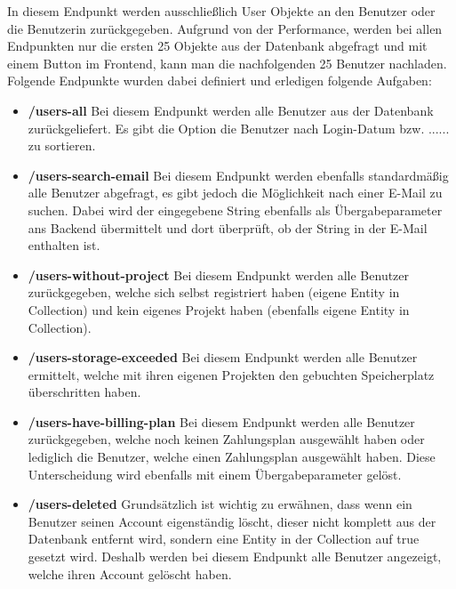 In diesem Endpunkt werden ausschließlich User Objekte an den Benutzer oder die Benutzerin zurückgegeben. Aufgrund von der Performance, werden bei allen Endpunkten nur die ersten 25 Objekte aus der Datenbank abgefragt und mit einem Button im Frontend, kann man die nachfolgenden 25 Benutzer nachladen. Folgende Endpunkte wurden dabei definiert und erledigen folgende Aufgaben:
\begin{itemize}
    \item \textbf{/users-all}
        \newline
        Bei diesem Endpunkt werden alle Benutzer aus der Datenbank zurückgeliefert. Es gibt die Option die Benutzer nach Login-Datum bzw. ...... zu sortieren.
    \item \textbf{/users-search-email}
        \newline
        Bei diesem Endpunkt werden ebenfalls standardmäßig alle Benutzer abgefragt, es gibt jedoch die Möglichkeit nach einer E-Mail zu suchen. Dabei wird der eingegebene String ebenfalls als Übergabeparameter ans Backend übermittelt und dort überprüft, ob der String in der E-Mail enthalten ist.
    \item \textbf{/users-without-project}
        \newline
        Bei diesem Endpunkt werden alle Benutzer zurückgegeben, welche sich selbst registriert haben (eigene Entity in Collection) und kein eigenes Projekt haben (ebenfalls eigene Entity in Collection).
    \item \textbf{/users-storage-exceeded}
        \newline
        Bei diesem Endpunkt werden alle Benutzer ermittelt, welche mit ihren eigenen Projekten den gebuchten Speicherplatz überschritten haben.
    \item \textbf{/users-have-billing-plan}
        \newline
        Bei diesem Endpunkt werden alle Benutzer zurückgegeben, welche noch keinen Zahlungsplan ausgewählt haben oder lediglich die Benutzer, welche einen Zahlungsplan ausgewählt haben. Diese Unterscheidung wird ebenfalls mit einem Übergabeparameter gelöst.
    \item \textbf{/users-deleted}
        \newline
        Grundsätzlich ist wichtig zu erwähnen, dass wenn ein Benutzer seinen Account eigenständig löscht, dieser nicht komplett aus der Datenbank entfernt wird, sondern eine Entity in der Collection auf true gesetzt wird. Deshalb werden bei diesem Endpunkt alle Benutzer angezeigt, welche ihren Account gelöscht haben.

\end{itemize}
